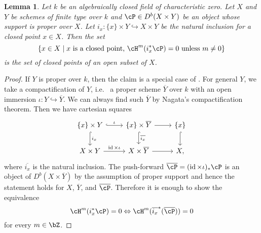 \documentclass[12pt]{amsart}
\numberwithin{equation}{section}
\theoremstyle{plain}
\newtheorem{lemma}[theorem]{Lemma}
\theoremstyle{definition}
\DeclareMathOperator{\id}{\mathrm{id}}
\begin{document}
\begin{lemma}\label{lem:degree-is-locally-constant}
    Let $k$ be an algebraically closed field of characteristic zero.
    Let $X$ and $Y$ be schemes of finite type over $k$ and $\cP \in D^b(X \times Y)$ be an object whose support is proper over $X$.
    Let $i_x \colon \{x\} \times Y \hookrightarrow X \times Y$ be the natural inclusion for a closed point $x \in X$.
    Then the set
    \begin{equation}
        \left\{x \in X \mid x\text{ is a closed point, }\cH^m(i_x^*\cP) = 0 \text{ unless } m \neq 0\right\}
    \end{equation}
    is the set of closed points of an open subset of $X$.
\end{lemma}
\begin{proof}
    If $Y$ is proper over $k$, then the claim is a special case of \cite[Lemma 3.1.6]{Bridgeland2002FourierMukaiTF}.
    For general $Y$, we take a compactification of $Y$, i.e.~ a proper scheme $\overline{Y}$ over $k$ with an open immersion $\iota \colon Y \hookrightarrow \overline{Y}$.
    We can always find such $\overline{Y}$ by Nagata's compactification theorem.
    Then we have cartesian squares
    \[
        \begin{tikzcd}
            \{x\} \times Y \ar[r, hookrightarrow, "\iota"] \ar[d, hookrightarrow, "i_x"] & \{x\} \times \overline{Y} \ar[r] \ar[d, hookrightarrow, "\overline{i_x}"]& \{x\} \ar[d, hookrightarrow]\\
            X \times Y \ar[r, "\id \times \iota"] & X \times \overline{Y} \ar[r] & X,
        \end{tikzcd}
    \]
    where $\overline{i_x}$ is the natural inclusion.
    The push-forward $\overline{\cP} = (\id \times \iota)_* \cP$ is an object of $D^b(X \times \overline{Y})$ by the assumption of proper support and hence the statement holds for $X$, $\overline{Y}$, and $\overline{\cP}$.
    Therefore it is enough to show the equivalence
    \begin{equation}
        \cH^m(i_x^* \cP) = 0 \Leftrightarrow \cH^m(\overline{i_x}^*(\overline{\cP})) = 0
    \end{equation}
    for every $m \in \bZ$.




\end{proof}
\end{document}
